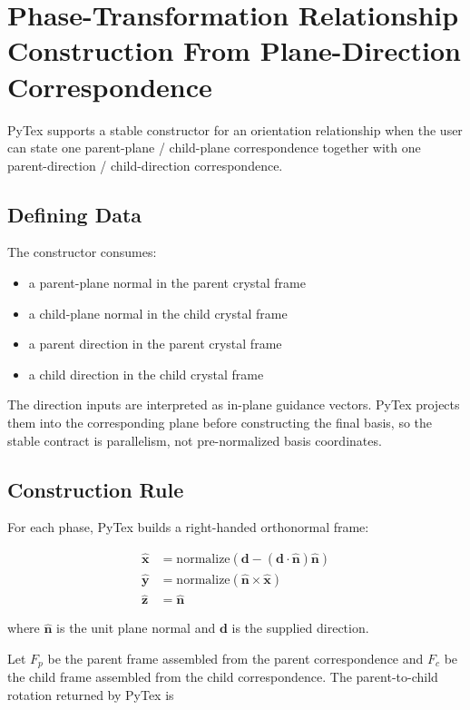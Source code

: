\section{Phase-Transformation Relationship Construction From Plane-Direction Correspondence}

PyTex supports a stable constructor for an orientation relationship when the user can state one
parent-plane / child-plane correspondence together with one parent-direction / child-direction
correspondence.

\subsection{Defining Data}

The constructor consumes:

\begin{itemize}
  \item a parent-plane normal in the parent crystal frame
  \item a child-plane normal in the child crystal frame
  \item a parent direction in the parent crystal frame
  \item a child direction in the child crystal frame
\end{itemize}

The direction inputs are interpreted as in-plane guidance vectors. PyTex projects them into the
corresponding plane before constructing the final basis, so the stable contract is parallelism, not
pre-normalized basis coordinates.

\subsection{Construction Rule}

For each phase, PyTex builds a right-handed orthonormal frame:

\begin{align}
\hat{\mathbf{x}} &= \mathrm{normalize}\left(\mathbf{d} - (\mathbf{d}\cdot\hat{\mathbf{n}})\hat{\mathbf{n}}\right) \\
\hat{\mathbf{y}} &= \mathrm{normalize}\left(\hat{\mathbf{n}} \times \hat{\mathbf{x}}\right) \\
\hat{\mathbf{z}} &= \hat{\mathbf{n}}
\end{align}

where $\hat{\mathbf{n}}$ is the unit plane normal and $\mathbf{d}$ is the supplied direction.

Let $F_p$ be the parent frame assembled from the parent correspondence and $F_c$ be the child
frame assembled from the child correspondence. The parent-to-child rotation returned by PyTex is

